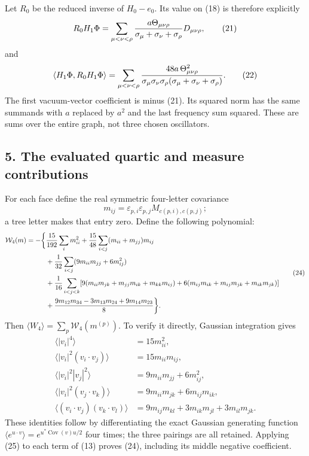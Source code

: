 \documentclass[
  11pt,
]{article}
\begin{document}
Let \(R_0\) be the reduced inverse of \(H_0-e_0\). Its value on (18) is
therefore explicitly \[
 R_0H_1\Phi=\sum_{\mu<\nu<\rho}
 {a\Theta_{\mu\nu\rho}\over\sigma_\mu+\sigma_\nu+\sigma_\rho}
                         D_{\mu\nu\rho},
 \tag{21}
\] and \[
 \langle H_1\Phi,R_0H_1\Phi\rangle
 =\sum_{\mu<\nu<\rho}
 {48a\,\Theta_{\mu\nu\rho}^2\over
      \sigma_\mu\sigma_\nu\sigma_\rho(\sigma_\mu+\sigma_\nu+\sigma_\rho)}.
 \tag{22}
\] The first vacuum-vector coefficient is minus (21). Its squared norm
has the same summands with \(a\) replaced by \(a^2\) and the last
frequency sum squared. These are sums over the entire graph, not three
chosen oscillators.

\subsection{5. The evaluated quartic and measure
contributions}\label{weak-coupling-part-15-the-evaluated-quartic-and-measure-contributions}

For each face define the real symmetric four-letter covariance \[
 m_{ij}=\varepsilon_{p,i}\varepsilon_{p,j}
                             M_{c(p,i),c(p,j)};
 \tag{23}
\] a tree letter makes that entry zero. Define the following polynomial:
\[
 \begin{split}
 \mathcal W_4(m)=-\bigg\{&
 {15\over192}\sum_i m_{ii}^2
 +{15\over48}\sum_{i<j}(m_{ii}+m_{jj})m_{ij}\\
 &+{1\over32}\sum_{i<j}(9m_{ii}m_{jj}+6m_{ij}^2)\\
 &+{1\over16}\sum_{i<j<k}
 [9(m_{ii}m_{jk}+m_{jj}m_{ik}+m_{kk}m_{ij})
       +6(m_{ij}m_{ik}+m_{ij}m_{jk}+m_{ik}m_{jk})]\\
 &+{9m_{12}m_{34}-3m_{13}m_{24}+9m_{14}m_{23}\over8}
 \bigg\}.
 \end{split}
 \tag{24}
\] Then \(\langle W_4\rangle=\sum_p\mathcal W_4(m^{(p)})\). To verify it
directly, Gaussian integration gives \[
 \begin{split}
 \langle |v_i|^4\rangle&=15m_{ii}^2,\\
 \langle |v_i|^2(v_i\cdot v_j)\rangle&=15m_{ii}m_{ij},\\
 \langle |v_i|^2|v_j|^2\rangle&=9m_{ii}m_{jj}+6m_{ij}^2,\\
 \langle |v_i|^2(v_j\cdot v_k)\rangle
                         &=9m_{ii}m_{jk}+6m_{ij}m_{ik},\\
 \langle(v_i\cdot v_j)(v_k\cdot v_l)\rangle
                         &=9m_{ij}m_{kl}+3m_{ik}m_{jl}+3m_{il}m_{jk}.
 \end{split}
 \tag{25}
\] These identities follow by differentiating the exact Gaussian
generating function
\(\langle e^{u\cdot v}\rangle=e^{u^*\operatorname{Cov}(v)u/2}\) four
times; the three pairings are all retained. Applying (25) to each term
of (13) proves (24), including its middle negative coefficient.
\end{document}
